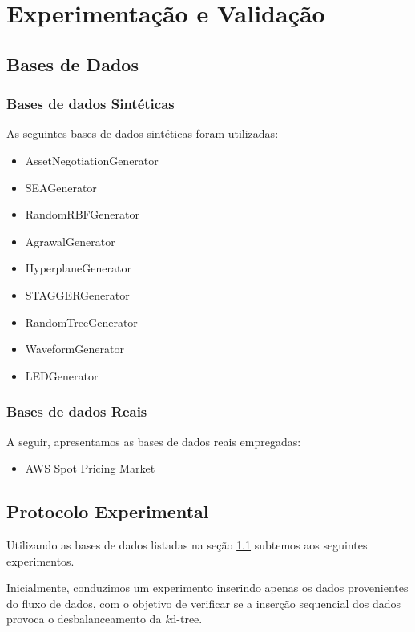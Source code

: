 \chapter{Experimentação e Validação}

\section{Bases de Dados}
\label{sec:bases_de_dados}

\subsection{Bases de dados Sintéticas}

As seguintes bases de dados sintéticas foram utilizadas:
\begin{itemize}
    \item AssetNegotiationGenerator
    \item SEAGenerator
    \item RandomRBFGenerator
    \item AgrawalGenerator
    \item HyperplaneGenerator
    \item STAGGERGenerator
    \item RandomTreeGenerator
    \item WaveformGenerator
    \item LEDGenerator
\end{itemize}

\subsection{Bases de dados Reais}

A seguir, apresentamos as bases de dados reais empregadas:
\begin{itemize}
    \item AWS Spot Pricing Market
\end{itemize}

\section{Protocolo Experimental}

Utilizando as bases de dados listadas na seção \ref{sec:bases_de_dados} subtemos aos seguintes experimentos.

Inicialmente, conduzimos um experimento inserindo apenas os dados provenientes do fluxo de dados, com o objetivo de verificar se a inserção sequencial dos dados provoca o desbalanceamento da \textit{k}d-tree.

